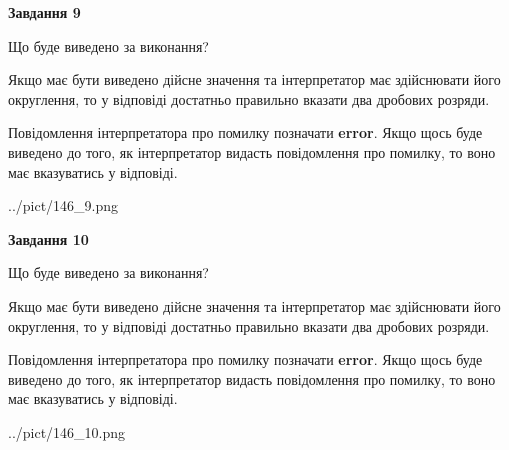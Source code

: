 \documentclass[12pt, ukrainian]{article}
\begin{document}
{\begin {Large}
{\begin {center}\textbf{Завдання 9}\end {center}}\par
Що буде виведено за виконання? \par

Якщо має бути виведено дійсне значення та інтерпретатор має здійснювати його округлення, 
то у відповіді достатньо правильно вказати два дробових розряди.

Повідомлення інтерпретатора про помилку позначати \textbf{error}.
Якщо щось буде виведено до того, як інтерпретатор видасть повідомлення про помилку, 
то воно має вказуватись у відповіді. \par

\begin{center}
	{../pict/146_9.png}
\end{center}
\newpage

{\begin {center}\textbf{Завдання 10}\end {center}}\par
Що буде виведено за виконання? \par

Якщо має бути виведено дійсне значення та інтерпретатор має здійснювати його округлення, 
то у відповіді достатньо правильно вказати два дробових розряди.

Повідомлення інтерпретатора про помилку позначати \textbf{error}.
Якщо щось буде виведено до того, як інтерпретатор видасть повідомлення про помилку, 
то воно має вказуватись у відповіді. \par

\begin{center}
	{../pict/146_10.png}
\end{center}
\newpage

\end {Large}}
\end{document}
